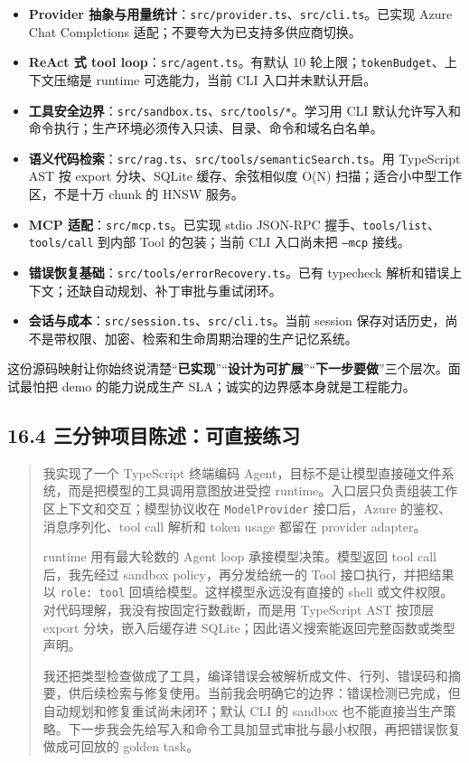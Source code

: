 \begin{itemize}[leftmargin=2em]
\item \textbf{Provider 抽象与用量统计}：\texttt{src/provider.ts}、\texttt{src/cli.ts}。已实现 Azure Chat Completions 适配；不要夸大为已支持多供应商切换。
\item \textbf{ReAct 式 tool loop}：\texttt{src/agent.ts}。有默认 10 轮上限；\texttt{tokenBudget}、上下文压缩是 runtime 可选能力，当前 CLI 入口并未默认开启。
\item \textbf{工具安全边界}：\texttt{src/sandbox.ts}、\texttt{src/tools/*}。学习用 CLI 默认允许写入和命令执行；生产环境必须传入只读、目录、命令和域名白名单。
\item \textbf{语义代码检索}：\texttt{src/rag.ts}、\texttt{src/tools/semanticSearch.ts}。用 TypeScript AST 按 export 分块、SQLite 缓存、余弦相似度 O(N) 扫描；适合小中型工作区，不是十万 chunk 的 HNSW 服务。
\item \textbf{MCP 适配}：\texttt{src/mcp.ts}。已实现 stdio JSON-RPC 握手、\texttt{tools/list}、\texttt{tools/call} 到内部 Tool 的包装；当前 CLI 入口尚未把 \texttt{--mcp} 接线。
\item \textbf{错误恢复基础}：\texttt{src/tools/errorRecovery.ts}。已有 typecheck 解析和错误上下文；还缺自动规划、补丁审批与重试闭环。
\item \textbf{会话与成本}：\texttt{src/session.ts}、\texttt{src/cli.ts}。当前 session 保存对话历史，尚不是带权限、加密、检索和生命周期治理的生产记忆系统。
\end{itemize}

这份源码映射让你始终说清楚“\textbf{已实现}”“\textbf{设计为可扩展}”“\textbf{下一步要做}”三个层次。面试最怕把 demo 的能力说成生产 SLA；诚实的边界感本身就是工程能力。

\subsection{16.4 三分钟项目陈述：可直接练习}

\begin{quote}
我实现了一个 TypeScript 终端编码 Agent，目标不是让模型直接碰文件系统，而是把模型的工具调用意图放进受控 runtime。入口层只负责组装工作区上下文和交互；模型协议收在 \texttt{ModelProvider} 接口后，Azure 的鉴权、消息序列化、tool call 解析和 token usage 都留在 provider adapter。

runtime 用有最大轮数的 Agent loop 承接模型决策。模型返回 tool call 后，我先经过 sandbox policy，再分发给统一的 Tool 接口执行，并把结果以 \texttt{role: tool} 回填给模型。这样模型永远没有直接的 shell 或文件权限。对代码理解，我没有按固定行数截断，而是用 TypeScript AST 按顶层 export 分块，嵌入后缓存进 SQLite；因此语义搜索能返回完整函数或类型声明。

我还把类型检查做成了工具，编译错误会被解析成文件、行列、错误码和摘要，供后续检索与修复使用。当前我会明确它的边界：错误检测已完成，但自动规划和修复重试尚未闭环；默认 CLI 的 sandbox 也不能直接当生产策略。下一步我会先给写入和命令工具加显式审批与最小权限，再把错误恢复做成可回放的 golden task。
\end{quote}

